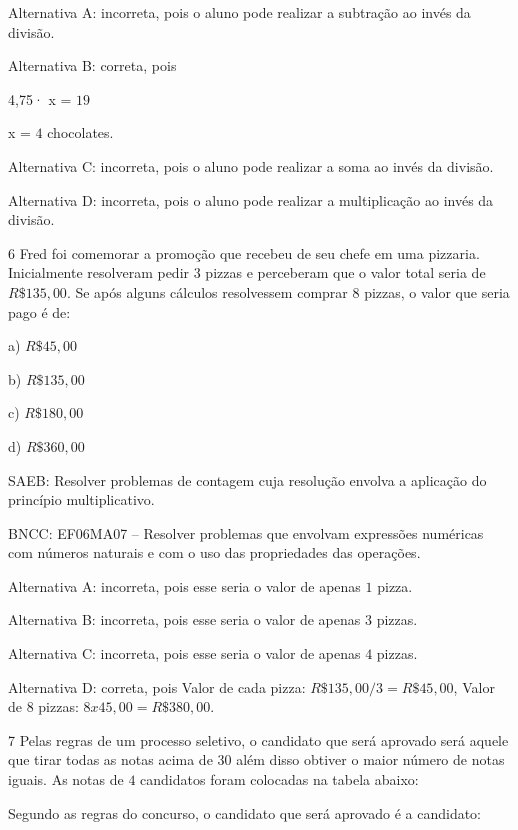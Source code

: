 Alternativa A: incorreta, pois o aluno pode realizar a subtração ao
invés da divisão.

Alternativa B: correta, pois

4,75· x = $19$

x = $4$ chocolates.

Alternativa C: incorreta, pois o aluno pode realizar a soma ao invés da
divisão.

Alternativa D: incorreta, pois o aluno pode realizar a multiplicação ao
invés da divisão.

\num{6}  Fred foi comemorar a promoção que recebeu de seu chefe em uma
pizzaria. Inicialmente resolveram pedir $3$ pizzas e perceberam que o
valor total seria de $R\$135,00$. Se após alguns cálculos resolvessem
comprar $8$ pizzas, o valor que seria pago é de:

a) $R\$45,00$

b) $R\$135,00$

c) $R\$180,00$

d) $R\$360,00$

SAEB: Resolver problemas de contagem cuja resolução envolva a aplicação
do princípio multiplicativo.

BNCC: EF06MA07 -- Resolver problemas que envolvam expressões numéricas
com números naturais e com o uso das propriedades das operações.

Alternativa A: incorreta, pois esse seria o valor de apenas $1$ pizza.

Alternativa B: incorreta, pois esse seria o valor de apenas $3$ pizzas.

Alternativa C: incorreta, pois esse seria o valor de apenas $4$ pizzas.

Alternativa D: correta, pois Valor de cada pizza: $R\$135,00/3 = R\$
45,00$, Valor de $8$ pizzas: $8 x 45,00 = R\$380,00$.

\num{7}  Pelas regras de um processo seletivo, o candidato que será aprovado
será aquele que tirar todas as notas acima de $30$ além disso obtiver o
maior número de notas iguais. As notas de $4$ candidatos foram colocadas
na tabela abaixo:


Segundo as regras do concurso, o candidato que será aprovado é a
candidato:

